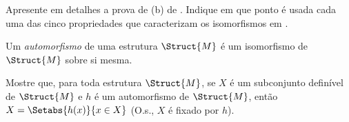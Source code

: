 \documentclass[../../../include/open-logic-section]{subfiles}
\begin{document}
\begin{prob}
Apresente em detalhes a prova de (b) de
. Indique em que ponto é usada cada uma
das cinco propriedades que caracterizam os isomorfismos em
.
\end{prob}

\begin{defn}
Um \emph{automorfismo} de uma estrutura $\Struct{M}$ é um isomorfismo
de $\Struct{M}$ sobre si mesma.
\end{defn}

\begin{prob}
Mostre que, para toda estrutura $\Struct{M}$, se $X$ é um subconjunto
definível de $\Struct{M}$ e $h$ é um automorfismo de $\Struct{M}$,
então $X = \Setabs{h(x)}{x \in X}$ (O.s.\@, $X$ é fixado por $h$).
\end{prob}
\end{document}
